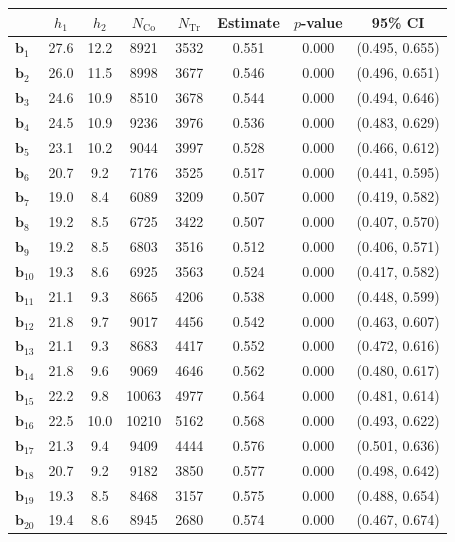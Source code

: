 \documentclass[10pt]{article}
\newcommand{\bb}{\mathbf{b}}
\begin{document}
\begin{table}[p]
    \centering
\begin{tabular}{lccccccc}
  \toprule\toprule
   & $h_1$ & $h_2$ & $N_{\mathrm{Co}}$ & $N_{\mathrm{Tr}}$ & Estimate & $p$-value & 95\% CI \\
  \midrule
   $\bb_{1}$ & 27.6 & 12.2 & 8921 & 3532 & 0.551 & 0.000 & (0.495, 0.655)\\
   $\bb_{2}$ & 26.0 & 11.5 & 8998 & 3677 & 0.546 & 0.000 & (0.496, 0.651)\\
   $\bb_{3}$ & 24.6 & 10.9 & 8510 & 3678 & 0.544 & 0.000 & (0.494, 0.646)\\
   $\bb_{4}$ & 24.5 & 10.9 & 9236 & 3976 & 0.536 & 0.000 & (0.483, 0.629)\\
   $\bb_{5}$ & 23.1 & 10.2 & 9044 & 3997 & 0.528 & 0.000 & (0.466, 0.612)\\
   $\bb_{6}$ & 20.7 & 9.2 & 7176 & 3525 & 0.517 & 0.000 & (0.441, 0.595)\\
   $\bb_{7}$ & 19.0 & 8.4 & 6089 & 3209 & 0.507 & 0.000 & (0.419, 0.582)\\
   $\bb_{8}$ & 19.2 & 8.5 & 6725 & 3422 & 0.507 & 0.000 & (0.407, 0.570)\\
   $\bb_{9}$ & 19.2 & 8.5 & 6803 & 3516 & 0.512 & 0.000 & (0.406, 0.571)\\
   $\bb_{10}$ & 19.3 & 8.6 & 6925 & 3563 & 0.524 & 0.000 & (0.417, 0.582)\\
   $\bb_{11}$ & 21.1 & 9.3 & 8665 & 4206 & 0.538 & 0.000 & (0.448, 0.599)\\
   $\bb_{12}$ & 21.8 & 9.7 & 9017 & 4456 & 0.542 & 0.000 & (0.463, 0.607)\\
   $\bb_{13}$ & 21.1 & 9.3 & 8683 & 4417 & 0.552 & 0.000 & (0.472, 0.616)\\
   $\bb_{14}$ & 21.8 & 9.6 & 9069 & 4646 & 0.562 & 0.000 & (0.480, 0.617)\\
   $\bb_{15}$ & 22.2 & 9.8 & 10063 & 4977 & 0.564 & 0.000 & (0.481, 0.614)\\
   $\bb_{16}$ & 22.5 & 10.0 & 10210 & 5162 & 0.568 & 0.000 & (0.493, 0.622)\\
   $\bb_{17}$ & 21.3 & 9.4 & 9409 & 4444 & 0.576 & 0.000 & (0.501, 0.636)\\
   $\bb_{18}$ & 20.7 & 9.2 & 9182 & 3850 & 0.577 & 0.000 & (0.498, 0.642)\\
   $\bb_{19}$ & 19.3 & 8.5 & 8468 & 3157 & 0.575 & 0.000 & (0.488, 0.654)\\
   $\bb_{20}$ & 19.4 & 8.6 & 8945 & 2680 & 0.574 & 0.000 & (0.467, 0.674)\\

\end{tabular}
\end{table}
\end{document}
